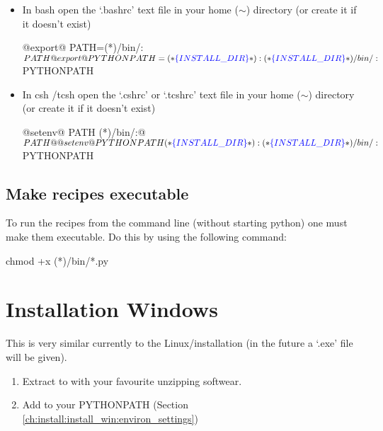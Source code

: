 \begin{itemize}
	\item In bash open the `.bashrc' text file in your home ($\sim$) directory (or create it if it doesn't exist)

	\begin{textbox}
	@export@ PATH=(*\InstallDIR*)/bin/:$PATH

	@export@ PYTHONPATH=(*\InstallDIR*):(*\InstallDIR*)/bin/:$PYTHONPATH
	\end{textbox}

	\item In csh /tcsh open the `.cshrc' or `.tcshrc' text file in your home ($\sim$) directory (or create it if it doesn't exist) 

	\begin{textbox}
	@setenv@ PATH (*\InstallDIR*)/bin/:@${PATH}@

	@setenv@ PYTHONPATH (*\InstallDIR*):(*\InstallDIR*)/bin/:${PYTHONPATH}
	\end{textbox}

\end{itemize}

\subsection{Make recipes executable}
\label{ch:install:installunix:executable}

\noindent To run the recipes from the command line (without starting python) one must make them executable. Do this by using the following command:
\begin{bashbox}
chmod +x (*\InstallDIR*)/bin/*.py
\end{bashbox}



\clearpage
\newpage
\section{Installation Windows}
\label{ch:install:install_win}

This is very similar currently to the Linux/\mac installation (in the future a `.exe' file will be given).

\begin{enumerate}
\item Extract to \InstallDIR with your favourite unzipping softwear.
\item Add \InstallDIR to your PYTHONPATH (Section \ref{ch:install:install_win:environ_settings})
\end{enumerate}


